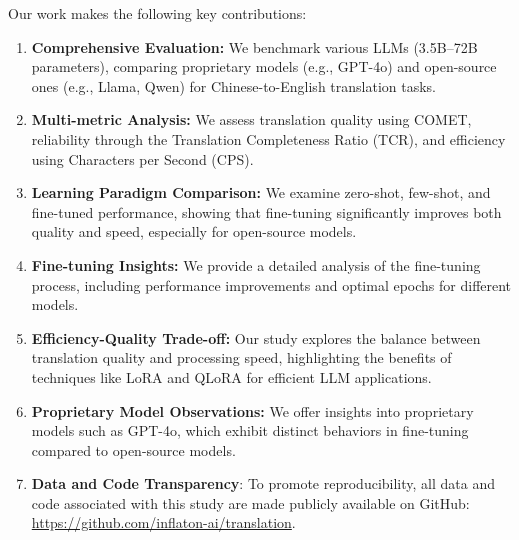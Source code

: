 \documentclass[conference]{IEEEtran}
\begin{document}

Our work makes the following key contributions:

\begin{enumerate}
    \item \textbf{Comprehensive Evaluation:} We benchmark various LLMs (3.5B–72B parameters), comparing proprietary models (e.g., GPT-4o) and open-source ones (e.g., Llama, Qwen) for Chinese-to-English translation tasks.
    
    \item \textbf{Multi-metric Analysis:} We assess translation quality using COMET, reliability through the Translation Completeness Ratio (TCR), and efficiency using Characters per Second (CPS).

    \item \textbf{Learning Paradigm Comparison:} We examine zero-shot, few-shot, and fine-tuned performance, showing that fine-tuning significantly improves both quality and speed, especially for open-source models.

    \item \textbf{Fine-tuning Insights:} We provide a detailed analysis of the fine-tuning process, including performance improvements and optimal epochs for different models.

    \item \textbf{Efficiency-Quality Trade-off:} Our study explores the balance between translation quality and processing speed, highlighting the benefits of techniques like LoRA and QLoRA for efficient LLM applications.
    
    \item \textbf{Proprietary Model Observations:} We offer insights into proprietary models such as GPT-4o, which exhibit distinct behaviors in fine-tuning compared to open-source models.

    \item \textbf{Data and Code Transparency}: To promote reproducibility, all data and code associated with this study are made publicly available on GitHub: \href{https://github.com/inflaton-ai/translation}{https://github.com/inflaton-ai/translation}.
\end{enumerate}
\end{document}
